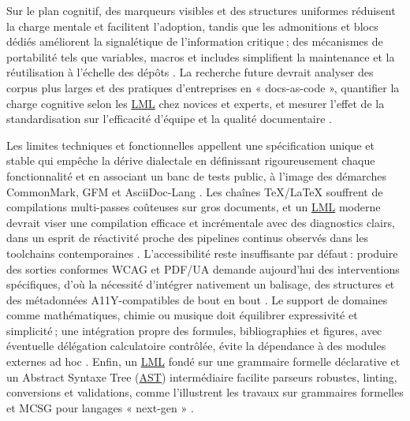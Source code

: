 \documentclass[a4paper,12pt]{article}
\begin{document}
Sur le plan cognitif, des marqueurs visibles et des structures uniformes réduisent la charge mentale et facilitent l’adoption, tandis que les admonitions et blocs dédiés améliorent la signalétique de l’information critique ; des mécanismes de portabilité tels que variables, macros et includes simplifient la maintenance et la réutilisation à l’échelle des dépôts \autocite{donathAdmonitionsMaterialMkDocs,allenAsciiDocWritersGuide,johnmacfarlanePandocUsersGuide2025}. La recherche future devrait analyser des corpus plus larges et des pratiques d’entreprises en « docs-as-code », quantifier la charge cognitive selon les \protect\hyperlink{gls-2}{\label{gls-2-use-4}LML} chez novices et experts, et mesurer l’effet de la standardisation sur l’efficacité d’équipe et la qualité documentaire \autocite{cadavidImprovingHardwareSoftware2023,cadavidDocumentationascodeInterfaceControl2022,liuHowReadMeFiles2022}.

Les limites techniques et fonctionnelles appellent une spécification unique et stable qui empêche la dérive dialectale en définissant rigoureusement chaque fonctionnalité et en associant un banc de tests public, à l’image des démarches CommonMark, GFM et AsciiDoc-Lang \autocite{johnmacfarlaneCommonMarkSpec2024,GitHubFlavoredMarkdown2019,EclipseProjectsAsciiDoc2025}. Les chaînes \TeX{}/\LaTeX{} souffrent de compilations multi-passes coûteuses sur gros documents, et un \protect\hyperlink{gls-2}{\label{gls-2-use-5}LML} moderne devrait viser une compilation efficace et incrémentale avec des diagnostics clairs, dans un esprit de réactivité proche des pipelines continus observés dans les toolchains contemporaines \autocite{petrolsakTeXNutshell2021,olsakComparisonOpTeXOther2021,petrolsakOpTeXNewGeneration2020}. L’accessibilité reste insuffisante par défaut : produire des sorties conformes WCAG et PDF/UA demande aujourd’hui des interventions spécifiques, d’où la nécessité d’intégrer nativement un balisage, des structures et des métadonnées A11Y-compatibles de bout en bout \autocite{LaTeXAccessibilityGuide2024,jasonc.whiteUsingMarkupLanguages2022,voeglerMarkdownSimpleSyntax2014}. Le support de domaines comme mathématiques, chimie ou musique doit équilibrer expressivité et simplicité ; une intégration propre des formules, bibliographies et figures, avec éventuelle délégation calculatoire contrôlée, évite la dépendance à des modules externes ad hoc \autocite{JupyterbookMystmd2025,schurovQqmbrIndentmlExtensible2017,kaliszykSurveyLanguagesFormalizing2020}. Enfin, un \protect\hyperlink{gls-2}{\label{gls-2-use-6}LML} fondé sur une grammaire formelle déclarative et un Abstract Syntaxe Tree
 (\protect\hyperlink{gls-3}{\label{gls-3-use-1}AST}) intermédiaire facilite parseurs robustes, linting, conversions et validations, comme l’illustrent les travaux sur grammaires formelles et MCSG pour langages « next-gen » \autocite{junghansGrammarStandardizedWiki2008,dekkerSchemaLanguageParser2025,ducasseMicrodownCleanExtensible2020}.
\end{document}
